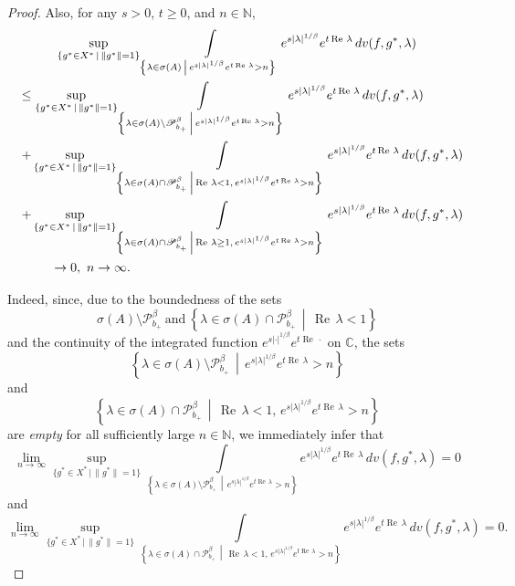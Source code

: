 \documentclass{amsart}
\theoremstyle{plain}
\theoremstyle{definition}
\begin{document}
\begin{proof}
Also, for any $s>0$, $t\ge 0$, and $n\in{{\mathbb N}}$,
\begin{multline}\label{second}
\sup_{\{g^*\in X^*\,|\,\|g^*\|=1\}}
\int\limits_{\left\{\lambda\in\sigma(A)\,\middle|\,e^{s|\lambda|^{1/\beta}}e^{t\operatorname{Re\,}\lambda}>n\right\}}
e^{s|\lambda|^{1/\beta}}e^{t\operatorname{Re\,}\lambda}\,dv(f,g^*,\lambda)
\\
\shoveleft{
\le \sup_{\{g^*\in X^*\,|\,\|g^*\|=1\}}
\int\limits_{\left\{\lambda\in\sigma(A)\setminus{\mathscr P}_{b_+}^\beta\,\middle|\,e^{s|\lambda|^{1/\beta}}e^{t\operatorname{Re\,}\lambda}>n\right\}}e^{s|\lambda|^{1/\beta}}e^{t\operatorname{Re\,}\lambda}\,dv(f,g^*,\lambda)
}\\
\shoveleft{
+ \sup_{\{g^*\in X^*\,|\,\|g^*\|=1\}}
\int\limits_{\left\{\lambda\in\sigma(A)\cap{\mathscr P}_{b_+}^\beta\,\middle|\,\operatorname{Re\,}\lambda<1,\, e^{s|\lambda|^{1/\beta}}e^{t\operatorname{Re\,}\lambda}>n\right\}}e^{s|\lambda|^{1/\beta}}e^{t\operatorname{Re\,}\lambda}\,dv(f,g^*,\lambda)
}\\
\shoveleft{
+ \sup_{\{g^*\in X^*\,|\,\|g^*\|=1\}}
\int\limits_{\left\{\lambda\in\sigma(A)\cap{\mathscr P}_{b_+}^\beta\,\middle|\,\operatorname{Re\,}\lambda\ge 1,\, e^{s|\lambda|^{1/\beta}}e^{t\operatorname{Re\,}\lambda}>n\right\}}e^{s|\lambda|^{1/\beta}}e^{t\operatorname{Re\,}\lambda}\,dv(f,g^*,\lambda)
}\\
\hspace{1.2cm}
\to 0,\ n\to\infty.
\hfill
\end{multline}

Indeed, since, due to the boundedness of the sets
\[
\sigma(A)\setminus{\mathscr P}_{b_+}^\beta\ \text{and}\
\left\{\lambda\in\sigma(A)\cap{\mathscr P}_{b_+}^\beta\,\middle|\,\operatorname{Re\,}\lambda<1\right\}
\]
and the continuity of the integrated function $e^{s|\cdot|^{1/\beta}}e^{t\operatorname{Re\,}\cdot}$ on ${{\mathbb C}}$,
the sets
\[
\left\{\lambda\in\sigma(A)\setminus{\mathscr P}_{b_+}^\beta\,\middle|\,e^{s|\lambda|^{1/\beta}}e^{t\operatorname{Re\,}\lambda}>n\right\}
\]
and 
\[
\left\{\lambda\in\sigma(A)\cap{\mathscr P}_{b_+}^\beta\,\middle|\,\operatorname{Re\,}\lambda<1,\, e^{s|\lambda|^{1/\beta}}e^{t\operatorname{Re\,}\lambda}>n\right\}
\]
are \textit{empty} for all sufficiently large $n\in {{\mathbb N}}$,
we immediately infer that
\[
\lim_{n\to\infty}\sup_{\{g^*\in X^*\,|\,\|g^*\|=1\}}
\int\limits_{\left\{\lambda\in\sigma(A)\setminus{\mathscr P}_{b_+}^\beta\,\middle|\,e^{s|\lambda|^{1/\beta}}e^{t\operatorname{Re\,}\lambda}>n\right\}}e^{s|\lambda|^{1/\beta}}e^{t\operatorname{Re\,}\lambda}\,dv(f,g^*,\lambda)=0
\]
and
\[
\lim_{n\to\infty}\sup_{\{g^*\in X^*\,|\,\|g^*\|=1\}}
\int\limits_{\left\{\lambda\in\sigma(A)\cap{\mathscr P}_{b_+}^\beta\,\middle|\,\operatorname{Re\,}\lambda<1,\, e^{s|\lambda|^{1/\beta}}e^{t\operatorname{Re\,}\lambda}>n\right\}}e^{s|\lambda|^{1/\beta}}e^{t\operatorname{Re\,}\lambda}\,dv(f,g^*,\lambda)
=0.
\]


\end{proof}
\end{document}
